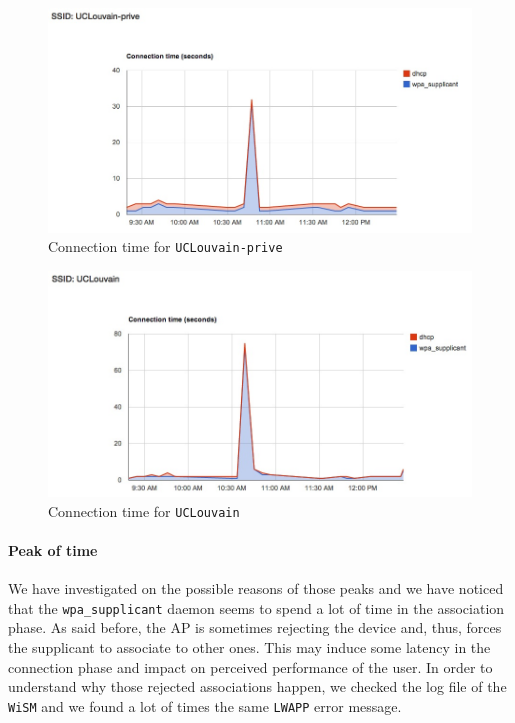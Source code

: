 \begin{figure}[H]
	\centering
   \includegraphics[width=1\textwidth]{Pictures/chapter6/time-uclouvain-prive.jpg}
   \caption{Connection time for \texttt{UCLouvain-prive}}
\end{figure} 

\begin{figure}[H]
	\centering
   \includegraphics[width=1\textwidth]{Pictures/chapter6/time-uclouvain.jpg}
   \caption{Connection time for \texttt{UCLouvain}}
\end{figure} 

\paragraph*{Peak of time} We have investigated on the possible reasons of those peaks and we have noticed that the \texttt{wpa\_supplicant} daemon seems to spend a lot of time in the association phase. As said before, the AP is sometimes rejecting the device and, thus, forces the supplicant to associate to other ones. This may induce some latency in the connection phase and impact on perceived performance of the user. In order to understand why those rejected associations happen, we checked the log file of the \texttt{WiSM} and we found a lot of times the same \texttt{LWAPP} error message.\\
\begin{lstlisting}[frame=single,breaklines=true,caption={\texttt{WiSM} association error message}]
%LWAPP-3-INVALID_AID2: Association identifier [int] for client [hex]:[hex]:[hex]:[hex]:[hex]:[hex] is already in use by[hex]:[hex]:[hex]:[hex]:[hex]:[hex]
\end{lstlisting}

